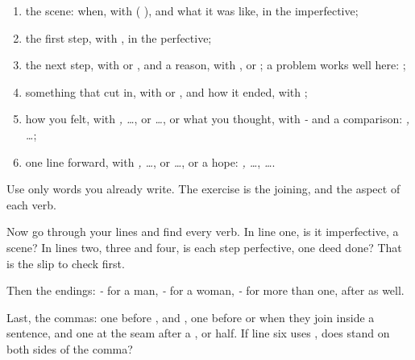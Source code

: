 \begin{enumerate}
\raggedright
  \item the scene: when, with \emph{} (\emph{ }), and what it was like, in the imperfective;
  \item the first step, with \emph{}, in the perfective;
  \item the next step, with \emph{} or \emph{}, and a reason, with \emph{ }, \emph{} or \emph{ }; a problem works well here: \emph{   };
  \item something that cut in, with \emph{} or \emph{}, and how it ended, with \emph{};
  \item how you felt, with \emph{  ,  …}, \emph{ } or \emph{  …}, or what you thought, with \emph{-} and a comparison: \emph{,  …};
  \item one line forward, with \emph{     ,   …}, or \emph{   …}, or a hope: \emph{ ,  …}, \emph{  …}.
\end{enumerate}

Use only words you already write. The exercise is the joining, and the aspect of each verb.

\begin{tcolorbox}[breakable,colback=teal!4,colframe=teal!35!black,title={Before you move on}]
Now go through your lines and find every verb. In line one, is it imperfective, a scene? In lines two, three and four, is each step perfective, one deed done? That is the slip to check first.

Then the endings: \emph{-} for a man, \emph{-} for a woman, \emph{-} for more than one, after \emph{} as well.

Last, the commas: one before \emph{}, \emph{ } and \emph{}, one before \emph{} or \emph{ } when they join inside a sentence, and one at the seam after a \emph{}, \emph{} or \emph{} half. If line six uses \emph{ }, does \emph{} stand on both sides of the comma?
\end{tcolorbox}
